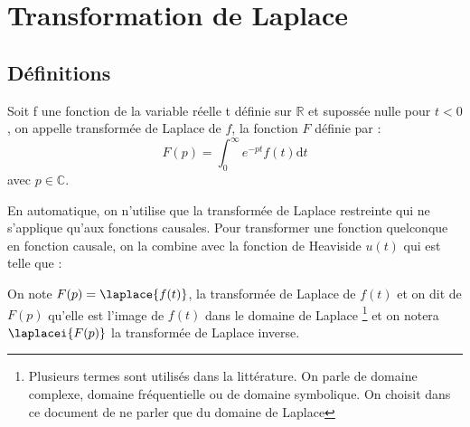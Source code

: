 \chapter{Transformation de Laplace\label{annexe-lap}}


\section{Définitions} 

Soit f une fonction de la variable réelle t définie sur $\mathbb{R}$ 
et supossée  nulle pour $t<0$, on appelle transformée de Laplace de $f$, la fonction $F$ définie par :
$$
F(p) = \int_0^\infty e^{-pt} f(t) \mathrm{d}t
$$
avec $p\in\mathbb{C}$. 

En automatique, on n'utilise que la transformée de Laplace restreinte qui 
ne s'applique qu'aux fonctions causales.
Pour transformer une fonction quelconque en fonction causale, 
on la combine avec la fonction de Heaviside $u(t)$ qui est telle que :



%
%

On note $F(p)=\laplace{f(t)}$, la transformée de Laplace de $f(t)$ et on dit de $F(p)$ qu'elle est l'image de $f(t)$
dans le domaine de Laplace
\footnote{Plusieurs termes sont utilisés dans la littérature. On parle 
de domaine complexe, domaine fréquentielle ou de domaine symbolique. On choisit dans ce document 
de ne parler que du domaine de Laplace} et on notera $\laplacei{F(p)}$ la transformée de Laplace inverse.
